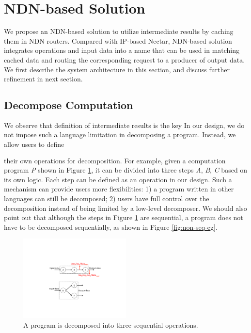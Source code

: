 \section{NDN-based Solution}
We propose an NDN-based solution to utilize intermediate results by caching them in NDN routers.  
Compared with IP-based Nectar, NDN-based solution integrates operations and input data into a name that can be used in matching cached data and routing the corresponding request to a producer of output data.
We first describe the system architecture in this section, and discuss further refinement in next section.

\subsection{Decompose Computation}
We observe that definition of intermediate results is the key 
In our design, we do not impose such a language limitation in decomposing a program.
Instead, we allow users to define 

their own operations for decomposition.  
For example, given a computation program {\it P} shown in Figure \ref{fig:seq-eg}, it can be divided into three steps {\it A}, {\it B}, {\it C} based on its own logic.  
Each step can be defined as an operation in our design.  
Such a mechanism can provide users more flexibilities: 
1) a program written in other languages can still be decomposed;
2) users have full control over the decomposition instead of being limited by a low-level decomposer.  
We should also point out that although the steps in Figure \ref{fig:seq-eg} are sequential, a program does not have to be decomposed sequentially, as shown in Figure \ref{fig:non-seq-eg}.

\begin{figure}
\begin{center}
\includegraphics[width=0.5\textwidth]{fig-p-r/seq-eg.pdf}
\end{center}
\caption{A program is decomposed into three sequential operations.}
\label{fig:seq-eg}
\end{figure}

